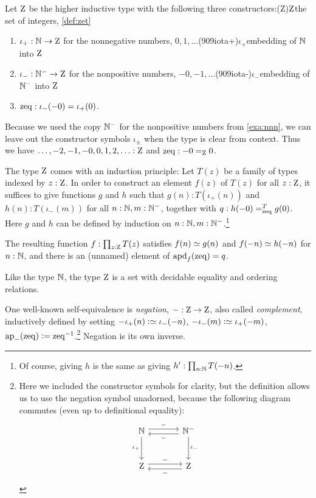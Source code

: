 \begin{definition}\label{def:zet}
  Let $\mathrm{Z}$ be the higher inductive type with the following three
  constructors:\glossary(Z){$\protect\mathrm{Z}$}{the set of integers,
  \cref{def:zet}}
\begin{enumerate}
\item $\iota_+: \mathbb{N} \to \mathrm{Z}$ for the nonnegative numbers,
  $0,1,\ldots$\glossary(909iota+){$\iota_+$}{embedding of $\mathbb{N}$ into $\mathrm{Z}$}
\item $\iota_-: \mathbb{N}^{-} \to \mathrm{Z}$ for the nonpositive numbers,
  $-0,-1,\ldots$\glossary(909iota-){$\iota_-$}{embedding of $\mathbb{N}^{-}$ into $\mathrm{Z}$}
\item $\mathrm{zeq} : \iota_-(-0) = \iota_+(0)$.
\end{enumerate}
Because we used the copy $\mathbb{N}^{-}$ for the nonpositive numbers from \cref{exa:nnn},
we can leave out the constructor symbols $\iota_\pm$
when the type is clear from context.
Thus we have $\ldots,-2,-1,-0,0,1,2,\ldots:\mathrm{Z}$ and $\mathrm{zeq}:-0=_{\mathrm{Z}}0$.

The type $\mathrm{Z}$ comes with an induction principle:
Let $T(z)$ be a family of types indexed by $z:\mathrm{Z}$.
In order to construct an element $f(z)$ of $T(z)$ for all $z:\mathrm{Z}$,
it suffices to give functions $g$ and $h$ such
that $g(n): T(\iota_+(n))$ and $h(n): T(\iota_-(m))$ for all $n:\mathbb{N},m:\mathbb{N}^{-}$,
together with $q : \pathover {h(-0)} T \zeq {g(0)}$.
Here $g$ and $h$ can be defined by induction on $n:\mathbb{N},m:\mathbb{N}^{-}$.\footnote{%
  Of course, giving $h$ is the same as giving $h':\prod_{n:\mathbb{N}}T(-n)$.}

The resulting function $f:\prod_{z:\mathrm{Z}}T(z)$ satisfies
$f(n)\jdeq g(n)$ and $f(-n)\jdeq h(-n)$ for $n:\mathbb{N}$,
and there is an (unnamed) element of $\apd{f}(\zeq) = q$.
\end{definition}

Like the type $\mathbb{N}$, the type $\mathrm{Z}$ is a set with decidable equality
and ordering relations.

One well-known self-equivalence is \emph{negation}, ${-}:\mathrm{Z}\to\mathrm{Z}$,
also called \emph{complement}, inductively defined by setting
$-\iota_+(n)\defeq \iota_-(-n)$,
$-\iota_-(m)\defeq \iota_+(-m)$,
$\mathrm{ap}_-(\mathrm{zeq}) \mathrel{\vcentcolon=} \mathrm{zeq}^{-1}$.\footnote{%
  Here we included the constructor symbols for clarity,
  but the definition allows us to use the negation symbol
  unadorned, because the following diagram
  commutes (even up to definitional equality):
  \[
    \begin{tikzcd}[column sep=large,row sep=large,ampersand replacement=\&]
      \NN \ar[r,shift left=1mm,"-"]\ar[d,"\iota_+"']
      \& \NNN \ar[l,shift left=1mm,"-"]\ar[d,"\iota_-"] \\
      \zet \ar[r,shift left=1mm,"-"]
      \& \zet \ar[l,shift left=1mm,"-"]
    \end{tikzcd}
  \]}
Negation is its own inverse.

